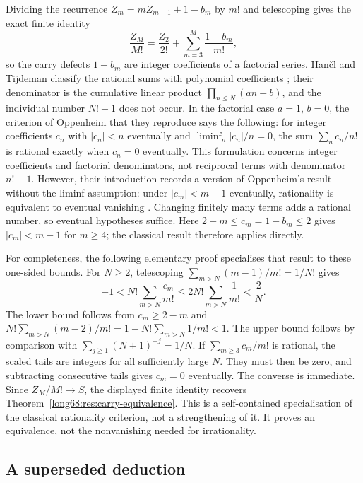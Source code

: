 \documentclass[11pt]{article}
\begin{document}
Dividing the recurrence $Z_m=mZ_{m-1}+1-b_m$ by $m!$ and
telescoping gives the exact finite identity
\[
 \frac{Z_M}{M!}=\frac{Z_2}{2!}+\sum_{m=3}^{M}\frac{1-b_m}{m!},
\]
so the carry defects $1-b_m$ are integer coefficients of a factorial series.
Han\v{c}l and Tijdeman classify the rational sums with polynomial coefficients
\cite[Thm.~3.1 and Cor.~3.1, pp.~390--391]{hancl-tijdeman}; their
denominator is the cumulative linear product $\prod_{n\le N}(an+b)$, and the
individual number $N!-1$ does not occur.  In the factorial case $a=1$, $b=0$, the criterion of Oppenheim that they
reproduce \cite[Lem.~2.2, p.~385]{hancl-tijdeman} says the following: for
integer coefficients $c_n$ with $|c_n|<n$ eventually and
$\liminf_n|c_n|/n=0$, the sum $\sum_n c_n/n!$ is rational exactly when
$c_n=0$ eventually. This formulation concerns integer coefficients and
factorial denominators, not reciprocal terms with denominator $n!-1$.
However, their introduction records a version of Oppenheim's result
without the liminf assumption: under $|c_m|<m-1$ eventually, rationality
is equivalent to eventual vanishing
\cite[Introduction, p.~383]{hancl-tijdeman}. Changing finitely many terms
adds a rational number, so eventual hypotheses suffice. Here
$2-m\le c_m=1-b_m\le2$ gives $|c_m|<m-1$ for $m\ge4$; the classical
result therefore applies directly.

For completeness, the following elementary proof specialises that result
to these one-sided bounds. For $N\ge2$, telescoping
$\sum_{m>N}(m-1)/m!=1/N!$ gives
\[
 -1<N!\sum_{m>N}\frac{c_m}{m!}
 \le2N!\sum_{m>N}\frac1{m!}<\frac2N.
\]
The lower bound follows from $c_m\ge2-m$ and
$N!\sum_{m>N}(m-2)/m!=1-N!\sum_{m>N}1/m!<1$.
The upper bound follows by comparison with
$\sum_{j\ge1}(N+1)^{-j}=1/N$.
If $\sum_{m\ge3}c_m/m!$ is rational, the scaled tails are integers for all
sufficiently large $N$. They must then be zero, and subtracting consecutive
tails gives $c_m=0$ eventually. The converse is immediate. Since
$Z_M/M!\to S$, the displayed finite identity recovers
Theorem~\ref{long68:res:carry-equivalence}. This is a self-contained
specialisation of the classical rationality criterion, not a strengthening
of it. It proves an equivalence, not the nonvanishing needed for irrationality.

\subsection{A superseded deduction}\label{long68:sec:ext-superseded}
\end{document}
